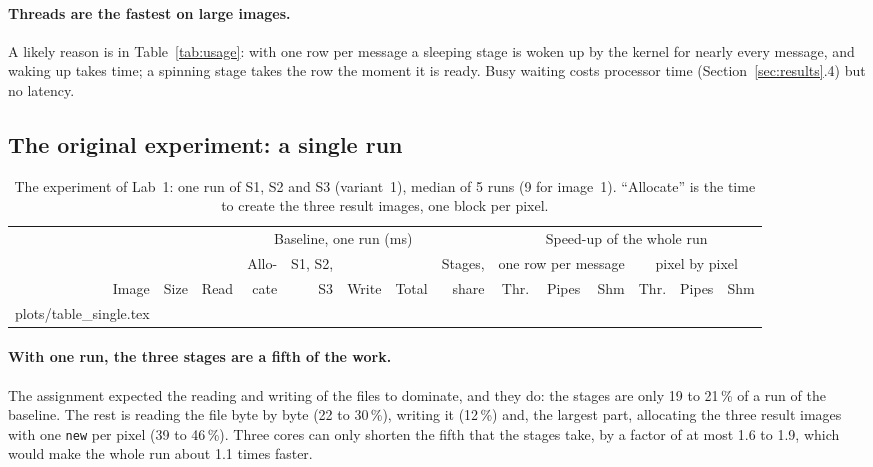 \documentclass[11pt,a4paper]{article}
\makeatletter
\newcommand{\rows}[1]{\@@input plots/#1.tex }
\makeatother
\begin{document}
\paragraph{Threads are the fastest on large images.} A likely reason is in Table~\ref{tab:usage}:
with one row per message a sleeping stage is woken up by the kernel for nearly every message, and
waking up takes time; a spinning stage takes the row the moment it is ready. Busy waiting costs
processor time (Section~\ref{sec:results}.4) but no latency.

\subsection{The original experiment: a single run}

\begin{table}[H]
\centering\small
\setlength{\tabcolsep}{3.7pt}
\begin{tabular}{@{}rl rrrrrr rrr rrr@{}}
\toprule
& & \multicolumn{6}{c}{Baseline, one run (ms)} & \multicolumn{6}{c}{Speed-up of the whole run} \\
\cmidrule(lr){3-8}\cmidrule(l){9-14}
& & & Allo- & S1, S2, & & & Stages, & \multicolumn{3}{c}{one row per message} & \multicolumn{3}{c}{pixel by pixel} \\
\cmidrule(lr){9-11}\cmidrule(l){12-14}
Image & Size & Read & cate & S3 & Write & Total & share & Thr. & Pipes & Shm & Thr. & Pipes & Shm \\
\midrule
\rows{table_single}
\bottomrule
\end{tabular}
\caption{The experiment of Lab~1: one run of S1, S2 and S3 (variant~1), median of 5 runs (9 for image~1).
``Allocate'' is the time to create the three result images, one block per pixel.}
\label{tab:single}
\end{table}

\paragraph{With one run, the three stages are a fifth of the work.} The assignment expected the
reading and writing of the files to dominate, and they do: the stages are only 19 to 21\,\% of a
run of the baseline. The rest is reading the file byte by byte (22 to 30\,\%), writing it
(12\,\%) and, the largest part, allocating the three result images with one \texttt{new} per pixel
(39 to 46\,\%). Three cores can only shorten the fifth that the stages take, by a factor of at most
1.6 to 1.9, which would make the whole run about 1.1 times faster.
\end{document}
